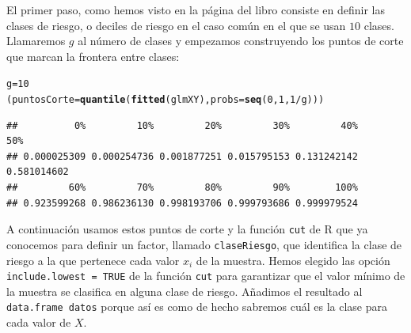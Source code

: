 \documentclass[10pt,a4paper]{article}\usepackage[]{graphicx}\usepackage[]{color}
\makeatletter
\newcommand{\hlnum}[1]{\textcolor[rgb]{0.686,0.059,0.569}{#1}}%
\newcommand{\hlopt}[1]{\textcolor[rgb]{0,0,0}{#1}}%
\newcommand{\hlstd}[1]{\textcolor[rgb]{0.345,0.345,0.345}{#1}}%
\newcommand{\hlkwb}[1]{\textcolor[rgb]{0.69,0.353,0.396}{#1}}%
\newcommand{\hlkwc}[1]{\textcolor[rgb]{0.333,0.667,0.333}{#1}}%
\newcommand{\hlkwd}[1]{\textcolor[rgb]{0.737,0.353,0.396}{\textbf{#1}}}%
\newenvironment{kframe}{%
 \def\at@end@of@kframe{}%
 \ifinner\ifhmode%
  \def\at@end@of@kframe{\end{minipage}}%
  \begin{minipage}{\columnwidth}%
 \fi\fi%
 \def\FrameCommand##1{\hskip\@totalleftmargin \hskip-\fboxsep
 \colorbox{shadecolor}{##1}\hskip-\fboxsep
     \hskip-\linewidth \hskip-\@totalleftmargin \hskip\columnwidth}%
 \MakeFramed {\advance\hsize-\width
   \@totalleftmargin\z@ \linewidth\hsize
   \@setminipage}}%
 {\par\unskip\endMakeFramed%
 \at@end@of@kframe}
\newenvironment{knitrout}{}{} %
\newcounter {cont01}
\makeatother
\begin{document}
El primer paso, como hemos visto en la página \pageref{curso-cap13:subsubsec:ConstruccionEstadisticoHosmerLemeshowPasoPaso}  del libro consiste en definir las clases de riesgo, o deciles de riesgo en el caso común en el que se usan $10$ clases. Llamaremos $g$ al número de clases y empezamos construyendo los puntos de corte que marcan la frontera entre clases:
\begin{knitrout}
\color{fgcolor}\begin{kframe}
\begin{alltt}
\hlstd{g} \hlkwb{=} \hlnum{10}
\hlstd{(puntosCorte} \hlkwb{=} \hlkwd{quantile}\hlstd{(}\hlkwd{fitted}\hlstd{(glmXY),} \hlkwc{probs} \hlstd{=} \hlkwd{seq}\hlstd{(}\hlnum{0}\hlstd{,} \hlnum{1}\hlstd{,} \hlnum{1}\hlopt{/}\hlstd{g)))}
\end{alltt}
\begin{verbatim}
##          0%         10%         20%         30%         40%         50% 
## 0.000025309 0.000254736 0.001877251 0.015795153 0.131242142 0.581014602 
##         60%         70%         80%         90%        100% 
## 0.923599268 0.986236130 0.998193706 0.999793686 0.999979524
\end{verbatim}
\end{kframe}
\end{knitrout}




A continuación usamos estos puntos de corte y la función {\tt cut} de R que ya conocemos para definir un factor, llamado {\tt claseRiesgo}, que identifica la clase de riesgo a la que pertenece cada valor $x_i$ de la muestra. Hemos elegido las opción {\tt  include.lowest = TRUE} de la función {\tt cut} para garantizar que el valor mínimo de la muestra se clasifica en alguna clase de riesgo. Añadimos el resultado al {\tt data.frame datos} porque así es como de hecho sabremos cuál es la clase para cada valor de $X$.
\end{document}
